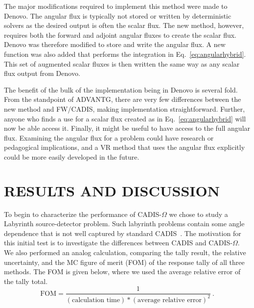 \documentclass[12pt]{article}
\begin{document}

The major modifications required to implement this method were made to Denovo. 
The angular flux is typically not stored or written by deterministic solvers as the desired output is often the scalar flux.
The new method, however, requires both the forward and adjoint angular fluxes to create the scalar flux. 
Denovo was therefore modified to store and write the angular flux.
A new function was also added that performs the integration in Eq.~\eqref{eq:angularhybrid}. 
This set of augmented scalar fluxes is then written the same way as any scalar flux output from Denovo.

The benefit of the bulk of the implementation being in Denovo is several fold. 
From the standpoint of ADVANTG, there are very few differences between the new method and FW/CADIS, making implementation straightforward.
Further, anyone who finds a use for a scalar flux created as in Eq.~\eqref{eq:angularhybrid} will now be able  access it.
Finally, it might be useful to have access to the full angular flux. 
Examining the angular flux for a problem could have research or pedagogical implications, and a VR method that uses the angular flux explicitly could be more easily developed in the future.

%
\section{RESULTS AND DISCUSSION} 
\label{sect::results}


To begin to characterize the performance of CADIS-$\Omega$ we chose to study a Labyrinth source-detector problem.
Such labyrinth problems contain some angle dependence that is not well captured by standard CADIS~\cite{peplow_consistent_2012}. 
The motivation for this initial test is to investigate the differences between CADIS and CADIS-$\Omega$.
We also performed an analog calculation, comparing  the tally result, the relative uncertainty, and the MC figure of merit (FOM) of the response tally of all three methods.
The FOM is given below, where we used the average relative error of the tally total.
%
\[\text{FOM} = \frac{1}{(\text{calculation time})*(\text{average relative error})^2}\:. \]
\end{document}

